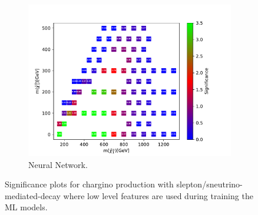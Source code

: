 \begin{figure}[H]
    \begin{subfigure}[t!]{0.49\textwidth}
    \includegraphics[width = \textwidth]{Figures/Significances/significance_NN_slepsnu_Low_level.pdf}
    \caption{Neural Network.}
        \label{fig:signLowslepsnuNN}
    \end{subfigure}
    \caption{Significance plots for chargino production with slepton/sneutrino-mediated-decay where low level features are used during training the ML models.}
    \label{fig:signLowslepsnu}
\end{figure}

